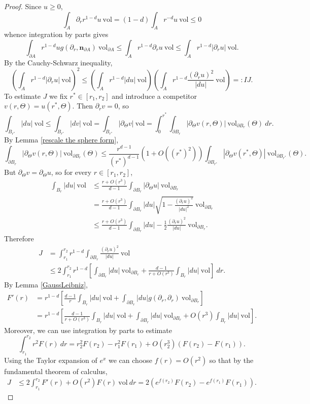 \documentclass[reqno,12pt,letterpaper]{amsart}
\newcommand{\normal}{\mathbf n}
\newcommand{\vol}{\mathrm{vol}}
\theoremstyle{definition}
\numberwithin{equation}{section}
\begin{document}
\begin{proof}
Since $u \geq 0$,
$$\int_A \partial_r  r^{1 - d}u ~\vol = (1 - d)\int_A r^{-d}u ~\vol \leq 0$$
whence integration by parts gives
$$\int_{\partial A} r^{1 - d} u g(\partial_r, \normal_{\partial A}) ~\vol_{\partial A} \leq \int_A r^{1 - d} \partial_r u ~\vol \leq \int_A r^{1 - d} |\partial_r u| ~\vol.$$
By the Cauchy-Schwarz inequality,
\begin{equation}\label{monotonicity CauchySchwarz}
\left(\int_A r^{1 - d} |\partial_r u| ~\vol \right)^2 \leq \left(\int_A r^{1 - d}|du|~\vol\right)\left(\int_A r^{1 - d}\frac{(\partial_ru)^2}{|du|} ~\vol\right) =: IJ.
\end{equation}
To estimate $J$ we fix $r^* \in [r_1, r_2]$ and introduce a competitor $v(r, \Theta) = u(r^*, \Theta)$. Then $\partial_r v = 0$, so
$$\int_{B_{r^*}} |du| ~\vol \leq \int_{B_{r^*}} |dv| ~\vol = \int_{B_{r^*}} |\partial_\Theta v| ~\vol = \int_0^{r^*} \int_{\partial B_r} |\partial_\Theta v(r, \Theta)| ~\vol_{\partial B_r}(\Theta) ~dr.$$
By Lemma \ref{rescale the sphere form},
$$\int_{\partial B_r} |\partial_\Theta v(r, \Theta)| ~\vol_{\partial B_r}(\Theta) \leq \frac{r^{d - 1}}{(r^*)^{d - 1}}(1 + O((r^*)^2)) \int_{\partial B_{r^*}} |\partial_\Theta v(r^*, \Theta)| ~\vol_{\partial B_{r^*}}(\Theta).$$
But $\partial_\Theta v = \partial_\Theta u$, so for every $r \in [r_1, r_2]$,
\begin{align*}
\int_{B_r} |du| ~\vol &\leq \frac{r + O(r^3)}{d - 1} \int_{\partial B_r} |\partial_\Theta u| ~\vol_{\partial B_r}\\
&= \frac{r + O(r^3)}{d - 1} \int_{\partial B_r} |du| \sqrt{1 - \frac{(\partial_r u)^2}{|du|^2}} ~\vol_{\partial B_r} \\
&\leq \frac{r + O(r^3)}{d - 1} \int_{\partial B_r} |du| - \frac{1}{2} \frac{(\partial_r u)^2}{|du|} ~\vol_{\partial B_r}.
\end{align*}
Therefore
\begin{align*}
J &= \int_{r_1}^{r_2} r^{1 - d} \int_{\partial B_r} \frac{(\partial_r u)^2}{|du|} ~\vol \\
&\leq 2 \int_{r_1}^{r_2} r^{1 - d} \left[\int_{\partial B_r} |du| ~\vol_{\partial B_r} + \frac{d - 1}{r + O(r^3)} \int_{B_r} |du| ~\vol\right] ~dr.
\end{align*}
By Lemma \ref{GaussLeibniz},
\begin{align*}
F'(r) &= r^{1 - d}\left[\frac{d - 1}{r} \int_{B_r} |du| ~\vol + \int_{\partial B_r} |du| g(\partial_r, \partial_r) ~\vol_{\partial B_r}\right]\\
&= r^{1 - d}\left[\frac{d - 1}{r + O(r^3)} \int_{B_r} |du| ~\vol + \int_{\partial B_r} |du| ~\vol_{\partial B_r} + O(r^3) \int_{B_r}|du| ~\vol\right].
\end{align*}
Moreover, we can use integration by parts to estimate
$$\int_{r_1}^{r_2} r^2 F(r) ~dr = r_2^2 F(r_2) - r_1^2 F(r_1) + O(r_2^3)(F(r_2) - F(r_1)).$$
Using the Taylor expansion of $e^x$ we can choose $f(r) = O(r^2)$ so that by the fundamental theorem of calculus,
\begin{align*}
J &\leq 2\int_{r_1}^{r_2} F'(r) + O(r^2)F(r) ~\vol ~dr = 2(e^{f(r_2)} F(r_2) - e^{f(r_1)} F(r_1)).
\end{align*}


\end{proof}
\end{document}
